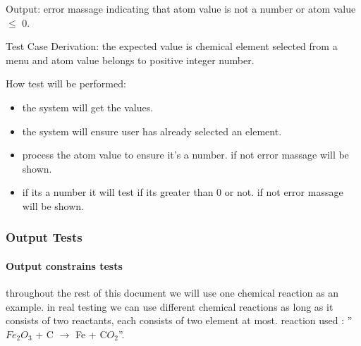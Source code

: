 \documentclass[12pt, titlepage]{article}
\begin{document}
\begin{enumerate}
Output: error massage indicating that atom value is not a number or atom value $\leq$ 0. 

Test Case Derivation: the expected value is chemical element selected from a menu and atom value belongs to positive integer number. 

How test will be performed: 
\begin{itemize}
\item the system will get the values. 
\item the system will ensure user has already selected an element. 
\item process the atom value to ensure it's a number. if not error massage will be shown.
\item if its a number it will test if its greater than 0 or not.  if not error massage will be shown.
\end{itemize}


\end{enumerate}					

\subsubsection{Output Tests}

\paragraph{Output constrains tests}
throughout the rest of this document we will use one chemical reaction as an example. in real testing we can use different chemical reactions as long as it consists of two reactants, each consists of two element at most.
reaction used : ”$Fe_2$$O_3$ + C $\rightarrow$ Fe + C$O_2$”. 
\end{document}
